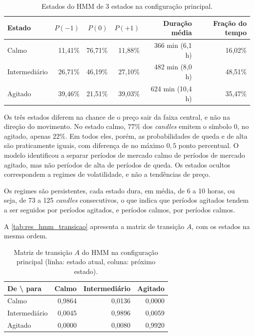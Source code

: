 \documentclass[
    12pt,                %
    openright,           %
    oneside,             %
    a4paper,             %
    english,             %
    brazil               %
]{abntex2}
\begin{document}
\begin{table}[htbp]
    \centering
    \caption{Estados do HMM de 3 estados na configuração principal.}
    \label{tab:res_hmm_estados}
    \small
    \begin{tabular}{@{}lrrrrr@{}}
        \toprule
        \textbf{Estado} & \textbf{$P(-1)$} & \textbf{$P(0)$} & \textbf{$P(+1)$} & \textbf{Duração média} & \textbf{Fração do tempo} \\
        \midrule
        Calmo         & 11,41\% & 76,71\% & 11,88\% & 366 min (6,1 h)  & 16,02\% \\
        Intermediário & 26,71\% & 46,19\% & 27,10\% & 482 min (8,0 h)  & 48,51\% \\
        Agitado       & 39,46\% & 21,51\% & 39,03\% & 624 min (10,4 h) & 35,47\% \\
        \bottomrule
    \end{tabular}
\end{table}

Os três estados diferem na chance de o preço sair da faixa central, e não na direção do movimento. No estado calmo, $77\%$ dos \textit{candles} emitem o 
símbolo $0$, no agitado, apenas $22\%$. Em todos eles, porém, as probabilidades de queda e de alta são praticamente iguais, com diferença de no máximo $0{,}5$ 
ponto percentual. O modelo identificou a separar períodos de mercado calmo de períodos de mercado agitado, mas não períodos de alta de períodos de queda. 
Os estados ocultos correspondem a regimes de volatilidade, e não a tendências de preço.

Os regimes são persistentes, cada estado dura, em média, de 6 a 10 horas, ou seja, de 73 a 125 \textit{candles} consecutivos,
o que indica que períodos agitados tendem a ser seguidos por períodos agitados, e períodos calmos, por períodos calmos.

A \autoref{tab:res_hmm_transicao} apresenta a matriz de transição $A$, com os estados na mesma ordem.

\begin{table}[htbp]
    \centering
    \caption{Matriz de transição $A$ do HMM na configuração principal (linha: estado atual, coluna: próximo estado).}
    \label{tab:res_hmm_transicao}
    \small
    \begin{tabular}{@{}lrrr@{}}
        \toprule
        \textbf{De \textbackslash{} para} & \textbf{Calmo} & \textbf{Intermediário} & \textbf{Agitado} \\
        \midrule
        Calmo         & 0,9864 & 0,0136 & 0,0000 \\
        Intermediário & 0,0045 & 0,9896 & 0,0059 \\
        Agitado       & 0,0000 & 0,0080 & 0,9920 \\
        \bottomrule
    \end{tabular}
\end{table}
\end{document}
